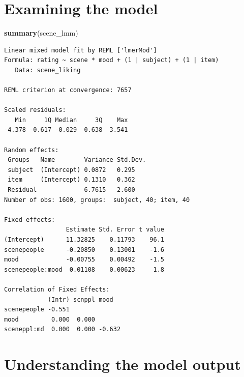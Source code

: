 \documentclass[]{article}
\newenvironment{Shaded}{}{}
\newcommand{\KeywordTok}[1]{\textcolor[rgb]{0.00,0.44,0.13}{\textbf{{#1}}}}
\newcommand{\NormalTok}[1]{{#1}}
\begin{document}
\section{Examining the model}\label{examining-the-model}

\begin{Shaded}
\begin{Highlighting}[]
\KeywordTok{summary}\NormalTok{(scene_lmm)}
\end{Highlighting}
\end{Shaded}

\begin{verbatim}
Linear mixed model fit by REML ['lmerMod']
Formula: rating ~ scene * mood + (1 | subject) + (1 | item)
   Data: scene_liking

REML criterion at convergence: 7657

Scaled residuals: 
   Min     1Q Median     3Q    Max 
-4.378 -0.617 -0.029  0.638  3.541 

Random effects:
 Groups   Name        Variance Std.Dev.
 subject  (Intercept) 0.0872   0.295   
 item     (Intercept) 0.1310   0.362   
 Residual             6.7615   2.600   
Number of obs: 1600, groups:  subject, 40; item, 40

Fixed effects:
                 Estimate Std. Error t value
(Intercept)      11.32825    0.11793    96.1
scenepeople      -0.20850    0.13001    -1.6
mood             -0.00755    0.00492    -1.5
scenepeople:mood  0.01108    0.00623     1.8

Correlation of Fixed Effects:
            (Intr) scnppl mood  
scenepeople -0.551              
mood         0.000  0.000       
sceneppl:md  0.000  0.000 -0.632
\end{verbatim}

\section{Understanding the model
output}\label{understanding-the-model-output}
\end{document}
